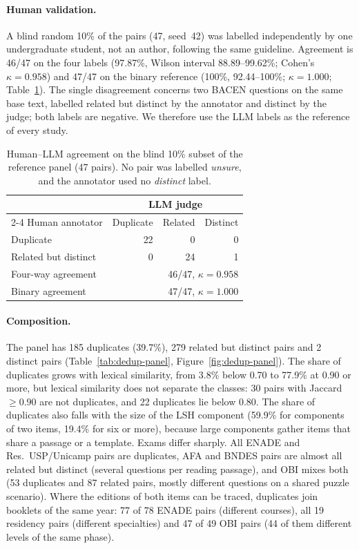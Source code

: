 \paragraph{Human validation.} A blind random 10\% of the pairs (47, seed~42)
was labelled independently by one undergraduate student, not an author,
following the same guideline. Agreement is 46/47 on the four labels
(97.87\%, Wilson interval 88.89--99.62\%; Cohen's $\kappa=0.958$) and 47/47 on
the binary reference (100\%, 92.44--100\%; $\kappa=1.000$;
Table~\ref{tab:dedup-agreement}). The single disagreement concerns two BACEN
questions on the same base text, labelled related but distinct by the
annotator and distinct by the judge; both labels are negative. We therefore use
the LLM labels as the reference of every study.

\begin{table}[t]
\centering
\footnotesize
\setlength{\tabcolsep}{4pt}
\begin{tabular}{@{}lrrr@{}}
\toprule
 & \multicolumn{3}{c}{LLM judge} \\
\cmidrule(l){2-4}
Human annotator & Duplicate & Related & Distinct \\
\midrule
Duplicate & 22 & 0 & 0 \\
Related but distinct & 0 & 24 & 1 \\
\midrule
Four-way agreement & \multicolumn{3}{r}{46/47, $\kappa=0.958$} \\
Binary agreement & \multicolumn{3}{r}{47/47, $\kappa=1.000$} \\
\bottomrule
\end{tabular}
\caption{Human--LLM agreement on the blind 10\% subset of the reference
panel (47 pairs). No pair was labelled \emph{unsure}, and the annotator used
no \emph{distinct} label.}
\label{tab:dedup-agreement}
\end{table}

\paragraph{Composition.} The panel has 185 duplicates (39.7\%), 279 related
but distinct pairs and 2 distinct pairs (Table~\ref{tab:dedup-panel},
Figure~\ref{fig:dedup-panel}). The share of duplicates grows with lexical
similarity, from 3.8\% below 0.70 to 77.9\% at 0.90 or more, but lexical
similarity does not separate the classes: 30 pairs with Jaccard $\ge 0.90$
are not duplicates, and 22 duplicates lie below 0.80. The share of duplicates
also falls with the size of the LSH component (59.9\% for components of two
items, 19.4\% for six or more), because large components gather items that
share a passage or a template. Exams differ sharply. All ENADE and
Res.\ USP/Unicamp pairs are duplicates, AFA and BNDES pairs are almost all
related but distinct (several questions per reading passage), and OBI mixes
both (53 duplicates and 87 related pairs, mostly different questions on a
shared puzzle scenario). Where the editions of both items can be traced,
duplicates join booklets of the same year: 77 of 78 ENADE pairs (different
courses), all 19 residency pairs (different specialties) and 47 of 49 OBI
pairs (44 of them different levels of the same phase).

